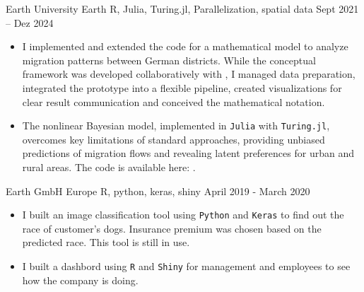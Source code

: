 
 {Earth University}
{Earth} {R, Julia, Turing.jl, Parallelization, spatial data} {Sept
  2021 – Dez 2024}
 \begin{itemize}
   \item I implemented and extended the code for a mathematical model
         to analyze migration patterns between German districts. While
         the conceptual framework was developed collaboratively with
         ,
         I managed data preparation, integrated the prototype into a
         flexible pipeline, created visualizations for clear result
         communication and conceived the mathematical notation.
   \item The nonlinear Bayesian model, implemented in \texttt{Julia}
         with \texttt{Turing.jl}, overcomes key limitations of
         standard approaches, providing unbiased predictions of
         migration flows and revealing latent preferences for urban
         and rural areas. The code is available here:
         \href{https://github.com/superscientist/earthmigration}{\faGithub}.
\end{itemize}
\medskip

 {Earth GmbH}
{Europe} {R, python, keras, shiny} {April 2019 - March 2020}
\begin{itemize}
  \item I built an image classification tool using \texttt{Python} and
        \texttt{Keras} to find out the race of customer's dogs.
        Insurance premium was chosen based on the predicted race. This
        tool is still in use.
  \item I built a dashbord using \texttt{R} and \texttt{Shiny} for
        management and employees to see how the company is doing.
\end{itemize}
